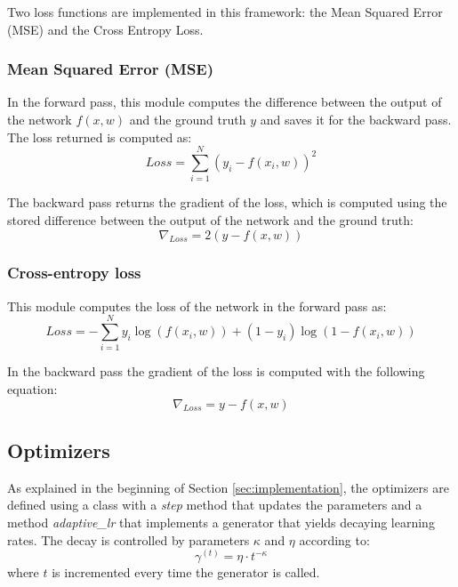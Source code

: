 \documentclass[10pt,conference,compsocconf]{IEEEtran}
\begin{document}
  Two loss functions are implemented in this framework: the Mean Squared Error (MSE) and the Cross Entropy Loss.
  	\subsubsection{Mean Squared Error (MSE)} %
  	\label{ssub:mean_squared_error}
        In the forward pass, this module computes the difference between the output of the network $f(x,w)$ and the ground truth $y$ and saves it for the backward pass. The loss returned is computed as:
      	\begin{equation} 
      	Loss = \sum_{i=1}^{N}(y_i - f(x_i,w))^2
      	\end{equation} 
      	
      	The backward pass returns the gradient of the loss, which is computed using the stored difference between the output of the network and the ground truth:
      	\begin{equation} 
      	    \nabla_{Loss} = 2 (y - f(x,w))
      	\end{equation} 
  	\subsubsection{Cross-entropy loss} %
  	\label{ssub:cross_entropy_loss}
  	This module computes the loss of the network in the forward pass as: 
  	\begin{equation}  
  	    Loss = -\sum_{i=1}^{N} y_i\log (f(x_i,w)) + (1 - y_i)\log(1 - f(x_i,w))
  	\end{equation} 
  	
  	In the backward pass the gradient of the loss is computed with the following equation:
  	\begin{equation}  
  	    \nabla_{Loss} =  y - f(x,w)
  	\end{equation} 
  \subsection{Optimizers} %
  \label{sub:optimizers}
  As explained in the beginning of Section \ref{sec:implementation}, the optimizers are defined using a class with a \textit{step} method that updates the parameters and a method \textit{adaptive\_lr} that implements a generator that yields decaying learning rates. The decay is controlled by parameters $\kappa$ and $\eta$ according to: 
    \begin{equation}
    \label{eq:lr}
  	    \gamma^{(t)} =  \eta\cdot t^ {-\kappa}
  	\end{equation} 
  	where $t$ is incremented every time the generator is called.
\end{document}
